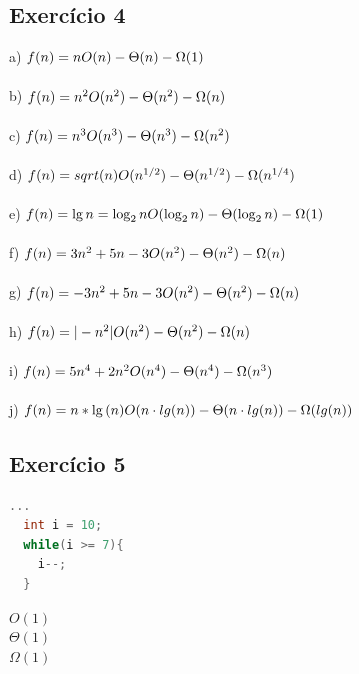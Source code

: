 \documentclass[12pt]{article}
\begin{document}
\subsection{Exercício 4}
  a) $f(n) = n \\
  O(n) - \Theta(n) - \Omega(1)$\\ \\
  b) $f(n) = n^{2} \\
  O(n^{2}) - \Theta(n^{2}) - \Omega(n)$\\ \\
  c) $f(n) = n^{3} \\
  O(n^{3}) - \Theta(n^{3}) - \Omega(n^{2})$\\ \\
  d) $f(n) = sqrt(n) \\
  O(n^{1/2}) - \Theta(n^{1/2}) - \Omega(n^{1/4})$\\ \\
  e) $f(n) = \lg{n} = \log_{2}{n} \\
  O(\log_{2}{n}) - \Theta(\log_{2}{n}) - \Omega(1)$\\ \\
  f) $f(n) = 3n^{2} + 5n - 3 \\
  O(n^{2}) - \Theta(n^{2}) - \Omega(n)$\\ \\
  g) $f(n) = -3n^{2} + 5n - 3 \\
  O(n^{2}) - \Theta(n^{2}) - \Omega(n)$\\ \\
  h) $f(n) = |-n^{2}| \\
  O(n^{2}) - \Theta(n^{2}) - \Omega(n)$\\ \\
  i) $f(n) = 5n^{4} + 2n^{2} \\
  O(n^{4}) - \Theta(n^{4}) - \Omega(n^{3})$\\ \\
  j) $f(n) = n * \lg{(n)} \\
  O(n \cdot lg(n)) - \Theta(n \cdot lg(n)) - \Omega(lg(n))$\\


\subsection{Exercício 5}
\begin{lstlisting}[language=C]
  ...
  int i = 10;
  while(i >= 7){
    i--;
  }
\end{lstlisting}
$O(1)$\\
$\Theta(1)$\\
$\Omega(1)$\\
\end{document}
